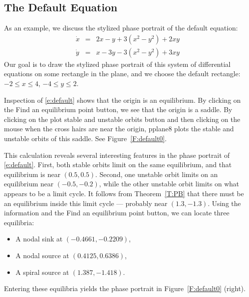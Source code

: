 \documentclass{ximera}
\begin{document}
\subsection*{The {\pplane} Default Equation}

As an example, we discuss the stylized phase portrait of the 
{\pplane} default equation:
\begin{equation}  \label{e:default}
\begin{array}{rcl}
\dot{x} & = & 2x-y+3(x^2-y^2)+2xy \\
\dot{y} & = & x-3y-3(x^2-y^2)+3xy
\end{array}
\end{equation} 
Our goal is to draw the stylized phase portrait of this system
of differential equations on some rectangle in the plane, and we
choose the default rectangle: $-2\leq x\leq 4$, $-4\leq y\leq 2$.

Inspection of \eqref{e:default} shows that the origin 
is an equilibrium.  By clicking on the {\sf Find an equilibrium point}
button, we see that the origin is a saddle.  By clicking on the
{\sf plot stable and unstable orbits} button and then clicking
on the mouse when the cross hairs are near the origin, {\sf
pplane8} plots the stable and unstable orbits of this saddle.
See Figure~\ref{F:default0}.

\begin{figure*}[htb]
           \centerline{%
	   }
           \caption{(Left) Stable and unstable orbits of the saddle at
		the origin in \protect\eqref{e:default}. (Right) Picture 
		of \protect\eqref{e:default} with equilibria added.}
           \label{F:default0}
\end{figure*}
 
This calculation reveals several interesting features in the
phase portrait of \eqref{e:default}.  First, both stable orbits limit on the 
same equilibrium, and that equilibrium is near $(0.5,0.5)$.  Second, one 
unstable orbit limits on an equilibrium near $(-0.5,-0.2)$, while the other 
unstable orbit limits on what appears to be a limit cycle.  It follows from 
Theorem~\ref{T:PB} that there must be an equilibrium inside this limit cycle 
--- probably near $(1.3,-1.3)$.  Using the information and the {\sf
Find an equilibrium point} button, we can locate three
equilibria:
\begin{itemize}
\item	A nodal sink at $(-0.4661,-0.2209)$,
\item	A nodal source at $(0.4125,0.6386)$,
\item	A spiral source at $(1.387,-1.418)$. 
\end{itemize}
Entering these equilibria yields the phase portrait in 
Figure~\ref{F:default0} (right). 
\end{document}
